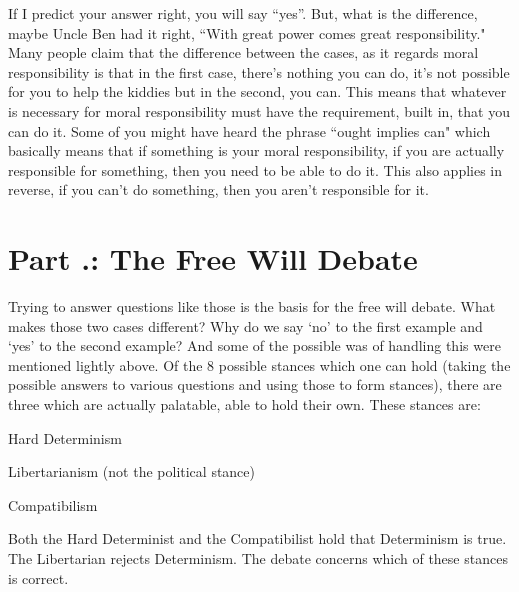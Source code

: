 
If I predict your answer right, you will say “yes”.  But, what is the difference, maybe Uncle Ben had it right, ``With great power comes great responsibility." Many people claim that the difference between the cases, as it regards moral responsibility is that in the first case, there’s nothing you can do, it’s not possible for you to help the kiddies but in the second, you can.  This means that whatever is necessary for moral responsibility must have the requirement, built in, that you can do it. Some of you might have heard the phrase ``ought implies can" which basically means that if something is your moral responsibility, if you are actually responsible for something, then you need to be able to do it. This also applies in reverse, if you can't do something, then you aren't responsible for it. 

\section{Part \thechapcount.\theseccount: The Free Will Debate}

Trying to answer questions like those is the basis for the free will debate. What makes those two cases different? Why do we say ‘no’ to the first example and ‘yes’ to the second example? And some of the possible was of handling this were mentioned lightly above. Of the 8 possible stances which one can hold (taking the possible answers to various questions and using those to form stances), there are three which are actually palatable, able to hold their own. These stances are:
\begin{earg}
   \item[]  Hard Determinism
    \item[] Libertarianism (not the political stance)
    \item[] Compatibilism 
\end{earg}
Both the Hard Determinist and the Compatibilist hold that Determinism is true. The Libertarian rejects Determinism. The debate concerns which of these stances is correct. 
